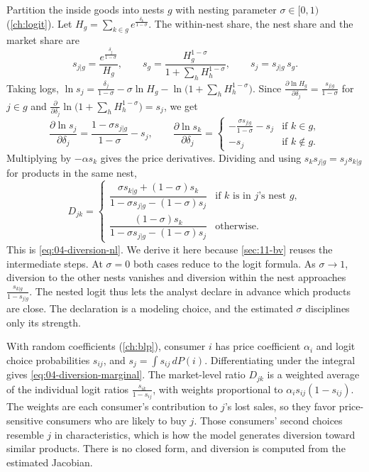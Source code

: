 Partition the inside goods into nests $g$ with nesting parameter $\sigma \in [0,1)$
(\cref{ch:logit}). Let $H_g = \sum_{k \in g} e^{\frac{\delta_k}{1 - \sigma}}$. The within-nest share, the nest share
and the market share are
\begin{equation*}
  s_{j|g} = \frac{e^{\frac{\delta_j}{1-\sigma}}}{H_g} , \qquad
  s_g = \frac{H_g^{1-\sigma}}{1 + \sum_h H_h^{1-\sigma}} , \qquad
  s_j = s_{j|g}\, s_g .
\end{equation*}
Taking logs, $\ln s_j = \frac{\delta_j}{1-\sigma} - \sigma \ln H_g - \ln\big(1 + \sum_h H_h^{1-\sigma}\big)$. Since
$\frac{\partial \ln H_g}{\partial \delta_j} = \frac{s_{j|g}}{1 - \sigma}$ for $j \in g$ and
$\frac{\partial}{\partial \delta_j}\ln\big(1 + \sum_h H_h^{1-\sigma}\big) = s_j$, we get
\begin{equation*}
  \frac{\partial \ln s_j}{\partial \delta_j} = \frac{1 - \sigma s_{j|g}}{1-\sigma} - s_j , \qquad
  \frac{\partial \ln s_k}{\partial \delta_j} =
  \begin{cases}
    -\frac{\sigma s_{j|g}}{1-\sigma} - s_j & \text{if } k \in g, \\[2pt]
    -s_j & \text{if } k \notin g .
  \end{cases}
\end{equation*}
Multiplying by $-\alpha s_k$ gives the price derivatives. Dividing and using $s_k s_{j|g} = s_j s_{k|g}$ for products
in the same nest,
\begin{equation}\label{eq:11-nl-diversion}
  D_{jk} =
  \begin{cases}
    \dfrac{\sigma s_{k|g} + (1-\sigma) s_k}{1 - \sigma s_{j|g} - (1-\sigma) s_j} & \text{if } k \text{ is in } j\text{'s nest } g, \\[12pt]
    \dfrac{(1-\sigma) s_k}{1 - \sigma s_{j|g} - (1-\sigma) s_j} & \text{otherwise.}
  \end{cases}
\end{equation}
This is \eqref{eq:04-diversion-nl}. We derive it here because \cref{sec:11-bv} reuses the intermediate steps. At
$\sigma = 0$ both cases reduce to the logit formula. As $\sigma \to 1$, diversion to the other nests vanishes and
diversion within the nest approaches $\frac{s_{k|g}}{1 - s_{j|g}}$. The nested logit thus lets the analyst declare in
advance which products are close. The declaration is a modeling choice, and the estimated $\sigma$ disciplines only
its strength.

 With random coefficients (\cref{ch:blp}), consumer $i$ has price coefficient
$\alpha_i$ and logit choice probabilities $s_{ij}$, and $s_j = \int s_{ij}\,dP(i)$. Differentiating under the integral
gives \eqref{eq:04-diversion-marginal}. The market-level ratio $D_{jk}$ is a weighted average of the individual logit
ratios $\frac{s_{ik}}{1 - s_{ij}}$, with weights proportional to $\alpha_i s_{ij}(1 - s_{ij})$. The weights are each
consumer's contribution to $j$'s lost sales, so they favor price-sensitive consumers who are likely to buy $j$. Those consumers'
second choices resemble $j$ in characteristics, which is how the model generates diversion toward similar products.
There is no closed form, and diversion is computed from the estimated Jacobian.

